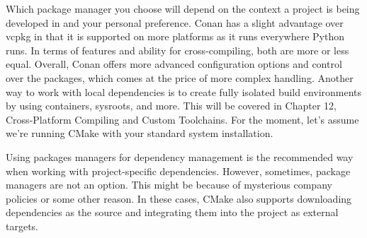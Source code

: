 Which package manager you choose will depend on the context a project is being developed in and your personal preference. Conan has a slight advantage over vcpkg in that it is supported on more platforms as it runs everywhere Python runs. In terms of features and ability for cross-compiling, both are more or less equal. Overall, Conan offers more advanced configuration options and control over the packages, which comes at the price of more complex handling. Another way to work with local dependencies is to create fully isolated build environments by using containers, sysroots, and more. This will be covered in Chapter 12, Cross-Platform Compiling and Custom Toolchains. For the moment, let's assume we're running CMake with your standard system installation. 

Using packages managers for dependency management is the recommended way when working with project-specific dependencies. However, sometimes, package managers are not an option. This might be because of mysterious company policies or some other reason. In these cases, CMake also supports downloading dependencies as the source and integrating them into the project as external targets.




